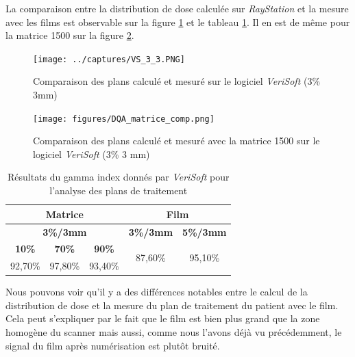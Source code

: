\documentclass{book}
\begin{document}
La comparaison entre la distribution de dose calculée sur \textit{RayStation} et la mesure avec les films est observable sur la figure \ref*{fig_dose_map_VS} et le tableau \ref*{table_gamma_index}. Il en est de même pour la matrice 1500 sur la figure \ref*{fig_dose_map_matrice}.

\begin{figure}[h]
  \centering
  \texttt{[image: ../captures/VS\_3\_3.PNG]}
  \caption{Comparaison des plans calculé et mesuré sur le logiciel \textit{VeriSoft} (3\% 3mm)}
  \label{fig_dose_map_VS}
\end{figure}

\begin{figure}[h]
  \centering
  \texttt{[image: figures/DQA\_matrice\_comp.png]}
  \caption{Comparaison des plans calculé et mesuré avec la matrice 1500 sur le logiciel \textit{VeriSoft} (3\% 3 mm)}
  \label{fig_dose_map_matrice}
\end{figure}

\begin{table}[h]
  \centering
  \begin{tabular}{|ccc|cc|}
  \hline
  \multicolumn{3}{|c|}{\textbf{Matrice}}                                 & \multicolumn{2}{c|}{\textbf{Film}}                       \\ \hline
  \multicolumn{3}{|c|}{\textbf{3\%/3mm}}                                 & \multicolumn{1}{c|}{\textbf{3\%/3mm}} & \textbf{5\%/3mm} \\ \hline
  \multicolumn{1}{|c|}{\textbf{10\%}} & \multicolumn{1}{c|}{\textbf{70\%}} & \textbf{90\%} & \multicolumn{1}{c|}{\multirow{2}{*}{87,60\%}} & \multirow{2}{*}{95,10\%} \\ \cline{1-3}
  \multicolumn{1}{|c|}{92,70\%} & \multicolumn{1}{c|}{97,80\%} & 93,40\% & \multicolumn{1}{c|}{}                 &                  \\ \hline
  \end{tabular}
  \caption{Résultats du gamma index donnés par \textit{VeriSoft} pour l'analyse des plans de traitement}
  \label{table_gamma_index}
  \end{table}

Nous pouvons voir qu'il y a des différences notables entre le calcul de la distribution de dose et la mesure du plan de traitement du patient avec le film. Cela peut s'expliquer par le fait que le film est bien plus grand que la zone homogène du scanner mais aussi, comme nous l'avons déjà vu précédemment, le signal du film après numérisation est plutôt bruité.
\end{document}
